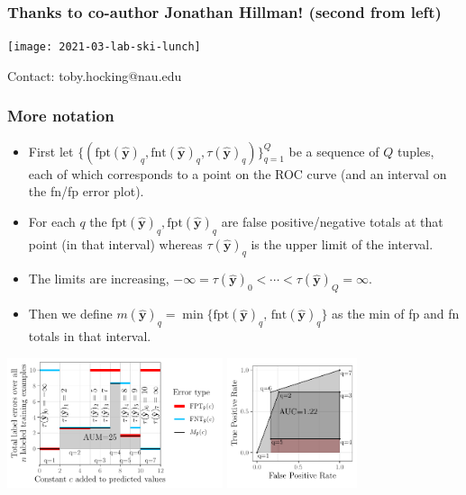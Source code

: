 \documentclass[t]{beamer}
\begin{document}
\begin{frame}
  \frametitle{Thanks to co-author Jonathan Hillman! (second from left)}

  \texttt{[image: 2021-03-lab-ski-lunch]} 

  Contact: toby.hocking@nau.edu

\end{frame}

\begin{frame}
  \frametitle{More notation}
  \begin{itemize}
  \item   First let $\{(
\text{fpt}
(\mathbf {\hat y})
_q, \text{fnt}
(\mathbf {\hat y})
_q,
 \tau
(\mathbf {\hat y})
_q
)\}_{q=1}^Q$ 
be a sequence of $Q$ tuples, each of which corresponds to a point on the ROC curve (and an interval on the fn/fp error plot). 
\item For each $q$ the
  $\text{fpt}(\mathbf {\hat y})_q, \text{fpt}(\mathbf {\hat y})_q$ are
  false positive/negative totals at that point (in that interval) whereas
  $\tau(\mathbf {\hat y})_q$ is the upper limit of the interval.
\item The limits are increasing, $ -\infty = \tau
(\mathbf {\hat y})
_0 < \cdots <  \tau
(\mathbf {\hat y})
_Q = \infty$.
\item Then we define $m(\mathbf {\hat y})_q = \min\{
    \text{fpt}(\mathbf {\hat y})_q , \, 
    \text{fnt}(\mathbf {\hat y})_q
\}$ as the min of fp and fn totals in that interval.
  \end{itemize}

  \includegraphics[height=1.5in]{figure-more-than-one-more-aum}
  \includegraphics[height=1.5in]{figure-more-than-one-more-auc}

\end{frame}
\end{document}
